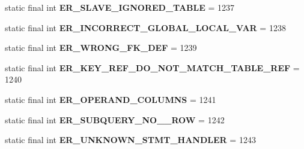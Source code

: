 \begin{DoxyCompactItemize}
\item 
\mbox{\label{classcom_1_1mysql_1_1cj_1_1exceptions_1_1_mysql_error_numbers_a28999eb3b6d29c0348e16817638fe6c7}} 
static final int {\bfseries E\+R\+\_\+\+S\+L\+A\+V\+E\+\_\+\+I\+G\+N\+O\+R\+E\+D\+\_\+\+T\+A\+B\+LE} = 1237
\item 
\mbox{\label{classcom_1_1mysql_1_1cj_1_1exceptions_1_1_mysql_error_numbers_a774b4e768b82e747560384759954a2d8}} 
static final int {\bfseries E\+R\+\_\+\+I\+N\+C\+O\+R\+R\+E\+C\+T\+\_\+\+G\+L\+O\+B\+A\+L\+\_\+\+L\+O\+C\+A\+L\+\_\+\+V\+AR} = 1238
\item 
\mbox{\label{classcom_1_1mysql_1_1cj_1_1exceptions_1_1_mysql_error_numbers_a689083fdab80f8d723906cff22becb84}} 
static final int {\bfseries E\+R\+\_\+\+W\+R\+O\+N\+G\+\_\+\+F\+K\+\_\+\+D\+EF} = 1239
\item 
\mbox{\label{classcom_1_1mysql_1_1cj_1_1exceptions_1_1_mysql_error_numbers_a4c993647baa0137a59bf46e637cb6ca7}} 
static final int {\bfseries E\+R\+\_\+\+K\+E\+Y\+\_\+\+R\+E\+F\+\_\+\+D\+O\+\_\+\+N\+O\+T\+\_\+\+M\+A\+T\+C\+H\+\_\+\+T\+A\+B\+L\+E\+\_\+\+R\+EF} = 1240
\item 
\mbox{\label{classcom_1_1mysql_1_1cj_1_1exceptions_1_1_mysql_error_numbers_a6404f3d1173dce70aaaadcb8f5236469}} 
static final int {\bfseries E\+R\+\_\+\+O\+P\+E\+R\+A\+N\+D\+\_\+\+C\+O\+L\+U\+M\+NS} = 1241
\item 
\mbox{\label{classcom_1_1mysql_1_1cj_1_1exceptions_1_1_mysql_error_numbers_a3c87784eb868590f67890515f01887f9}} 
static final int {\bfseries E\+R\+\_\+\+S\+U\+B\+Q\+U\+E\+R\+Y\+\_\+\+N\+O\+\_\+\_\+\+R\+OW} = 1242
\item 
\mbox{\label{classcom_1_1mysql_1_1cj_1_1exceptions_1_1_mysql_error_numbers_a35489404a9d77104f1c57f6ae80103be}} 
static final int {\bfseries E\+R\+\_\+\+U\+N\+K\+N\+O\+W\+N\+\_\+\+S\+T\+M\+T\+\_\+\+H\+A\+N\+D\+L\+ER} = 1243

\end{DoxyCompactItemize}

